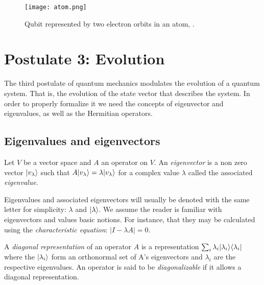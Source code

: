 \begin{figure}[h]
	\texttt{[image: atom.png]}
	\centering
	\caption{Qubit represented by two electron orbits in an atom, \cite{Nielsen2002}.}
	\label{fig 1.1}
\end{figure}


\section{Postulate 3: Evolution}


The third postulate of quantum mechanics modulates the evolution of a quantum system. That is, the evolution of the state vector that describes the system. In order to properly formalize it we need the concepts of eigenvector and eigenvalues, as well as the Hermitian operators.


\subsection{Eigenvalues and eigenvectors}


\begin{definition}
	Let $V$ be a vector space and $A$ an operator on $V$. An \emph{eigenvector} is a non zero vector $|v_\lambda\rangle$ such that $A|v_\lambda\rangle = \lambda|v_\lambda\rangle$ for a complex value $\lambda$ called the associated \emph{eigenvalue}.
\end{definition}

Eigenvalues and associated eigenvectors will usually be denoted with the same letter for simplicity: $\lambda$ and $|\lambda\rangle$. We assume the reader is familiar with eigenvectors and values basic notions. For instance, that they may be calculated using the \emph{characteristic equation}: $|I - \lambda A| = 0$.

\begin{definition}
	A \emph{diagonal representation} of an operator $A$ is a representation $\sum_i \lambda_i |\lambda_i\rangle\langle\lambda_i|$ where the $|\lambda_i\rangle$ form an orthonormal set of A's eigenvectors and $\lambda_i$ are the respective eigenvalues. An operator is said to be \emph{diagonalizable} if it allows a diagonal representation.
\end{definition}

